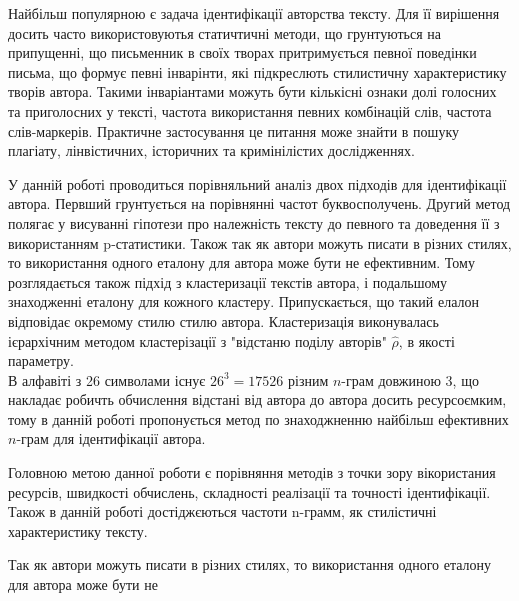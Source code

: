 \documentclass[12pt, a4paper]{extarticle}
\begin{document}
Найбільш популярною є задача ідентифікації авторства тексту. Для її вирішення досить часто використовуютья статичтичні методи, що грунтуються на припущенні, що письменник в своїх творах притримується певної поведінки письма, що формує певні інварінти, які підкреслють стилистичну характеристику творів автора. Такими інваріантами можуть бути кількісні ознаки долі голосних та приголосних у тексті, частота використання певних комбінацій слів, частота слів-маркерів. Практичне застосування це питання може знайти в пошуку плагіату, лінвістичних, історичних та кримінілістих дослідженнях.

У данній роботі проводиться порівняльний аналіз двох підходів для ідентифікації автора. Первший грунтується на порівнянні частот буквосполучень. Другий метод полягає у висуванні гіпотези про належність тексту до певного та доведення її з використанням p-статистики\cite{AnAssumptioninMachineLearning}. Також так як автори можуть писати в різних стилях, то використання одного еталону для автора може бути не ефективним. Тому розглядається також підхід з кластеризації текстів автора, і подальшому знаходженні еталону для кожного кластеру. Припускається, що такий елалон відповідає окремому стилю стилю автора. Кластеризація виконувалась ієрархічним методом кластерізації з "відстаню поділу авторів" $\hat{\rho}$, в якості параметру.\\
В алфавіті з 26 символами існує $26^3=17526$ різним $n$-грам довжиною 3, що накладає робичть обчислення відстані від автора до автора досить ресурсоємким, тому в данній роботі пропонується метод по знаходжненню найбільш ефективних $n$-грам для ідентифікації автора.


Головною метою данної роботи є порівняння методів з точки зору вікористания ресурсів, швидкості обчислень, складності реалізації та точності ідентифікації. Також в данній роботі достіджєються частоти n-грамм, як стилістичні характеристику тексту.

Так як автори можуть писати в різних стилях, то використання одного еталону для автора може бути не


\newpage
\end{document}

